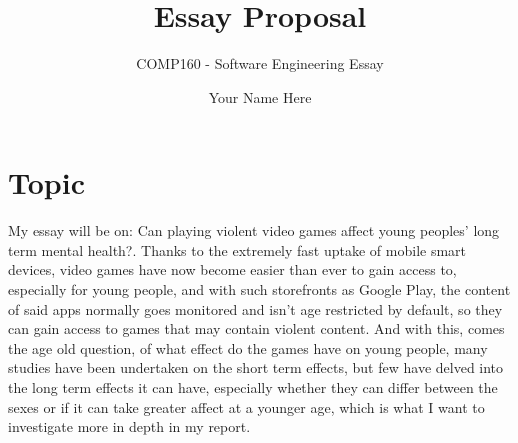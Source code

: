\documentclass{scrartcl}
\title{Essay Proposal}
\subtitle{COMP160 - Software Engineering Essay}
\author{Your Name Here}
\begin{document}
\maketitle

\section*{Topic}

My essay will be on: Can playing violent video games affect young peoples' long term mental health?. Thanks to the extremely fast uptake of mobile smart devices, video games have now become easier than ever to gain access to, especially for young people, and with such storefronts as Google Play, the content of said apps normally goes monitored and isn't age restricted by default, so they can gain access to games that may contain violent content. And with this, comes the age old question, of what effect do the games have on young people, many studies have been undertaken on the short term effects, but few have delved into the long term effects it can have, especially whether they can differ between the sexes or if it can take greater affect at a younger age, which is what I want to investigate more in depth in my report.


\end{document}
